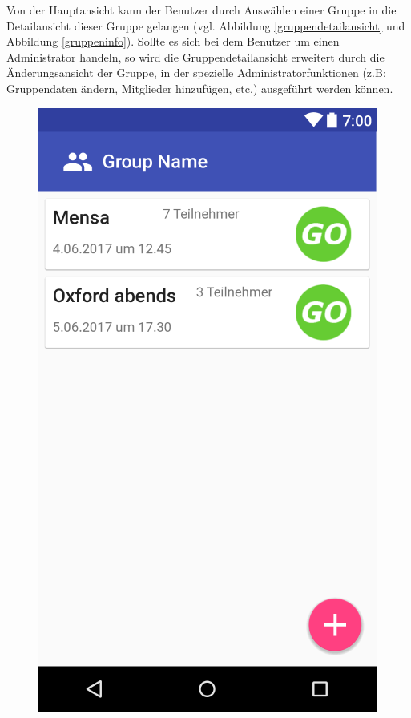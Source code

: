 \documentclass[parskip=full]{scrartcl}
\begin{document}
Von der Hauptansicht kann der Benutzer durch Auswählen einer Gruppe in die Detailansicht dieser Gruppe gelangen (vgl. Abbildung \ref{gruppendetailansicht} und Abbildung \ref{gruppeninfo}). Sollte es sich bei dem Benutzer um einen Administrator handeln, so wird die Gruppendetailansicht erweitert durch die Änderungsansicht der Gruppe, in der spezielle Administratorfunktionen (z.B: Gruppendaten ändern, Mitglieder hinzufügen, etc.) ausgeführt werden können.

\begin{figure}[H]
  \vspace{1cm}
  \centering
  \begin{minipage}[b]{0.4\textwidth}
    \includegraphics[width=\textwidth]{GUI/AndroidStudio/group_view.PNG}

\end{minipage}
\end{figure}
\end{document}
